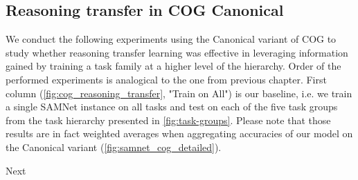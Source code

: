 



\subsection{Reasoning transfer in COG Canonical}
\label{sec:reasoning-transfer-cog}

We conduct the following experiments using the Canonical variant of COG to study whether reasoning transfer learning was effective in leveraging information gained by training a task family at a higher level of the hierarchy.
Order of the performed experiments is analogical to the one from previous chapter.
First column (\cref{fig:cog_reasoning_transfer}, "Train on All") is our baseline, i.e.
we train a single SAMNet instance on all tasks and test on each of the five task groups from the task hierarchy presented in \cref{fig:task-groups}.
Please note that those results are in fact weighted averages when aggregating accuracies of our model on the Canonical variant (\cref{fig:samnet_cog_detailed}).

Next 

